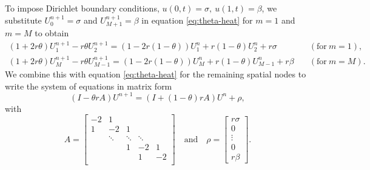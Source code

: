To impose Dirichlet boundary conditions, $u(0, t) = \sigma, \: u(1, t) = \beta$, 
we substitute $U_0^{n+1} = \sigma$ and $U_{M+1}^{n+1} = \beta$ in equation \eqref{eq:theta-heat} for $m=1$ and $m=M$ to obtain 
\begin{align*}
    \left(1+2r\theta\right)U_1^{n+1} - r\theta U_2^{n+1} = \left(1-2r(1-\theta)\right)U_1^n + r\left(1-\theta\right)U_2^n + r\sigma
    \quad & (\text{for} \: m=1), \\
    \left(1+2r\theta\right)U_{M}^{n+1} - r\theta U_{M-1}^{n+1} = \left(1-2r(1-\theta)\right)U_{M}^n + r\left(1-\theta\right)U_{M-1}^n + r\beta
    \quad & (\text{for} \: m=M). 
\end{align*}
We combine this with equation \ref{eq:theta-heat} for the remaining spatial nodes to write the system of equations in matrix form
\begin{equation}
    \left(I - \theta r A\right)U^{n+1} = \left(I + (1-\theta)r A\right)U^n+\rho, 
    \label{eq:theta-heat-matrix}
\end{equation}
with 
\begin{equation}
    A = 
    \begin{bmatrix}
    -2 & 1 \\
    1 & -2 & 1 & \\
      & \ddots & \ddots & \ddots & \\
      &   & 1 & -2 & 1 \\
      &   &  & 1 & -2 \\
    \end{bmatrix}
    \quad \text{and} \quad
    \rho = 
    \begin{bmatrix}
        r\sigma \\ 0 \\ \vdots \\ 0 \\ r\beta
    \end{bmatrix}
    .
    \label{eq:theta-heat-matrix-Dirichlet}
\end{equation}

